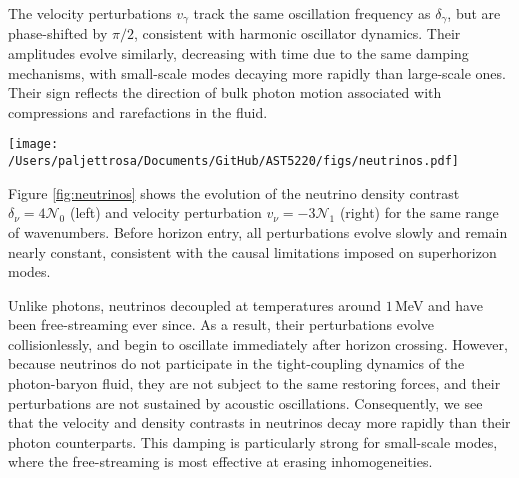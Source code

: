 \documentclass{aa}
\numberwithin{equation}{section}
\numberwithin{table}{section}
\numberwithin{figure}{section}
\begin{document}
The velocity perturbations $v_\gamma$ track the same oscillation frequency as $\delta_\gamma$, but are phase-shifted by $\pi/2$, consistent with harmonic oscillator dynamics. Their amplitudes evolve similarly, decreasing with time due to the same damping mechanisms, with small-scale modes decaying more rapidly than large-scale ones. Their sign reflects the direction of bulk photon motion associated with compressions and rarefactions in the fluid.


\begin{figure*}
  \centering
  \texttt{[image: /Users/paljettrosa/Documents/GitHub/AST5220/figs/neutrinos.pdf]}
  \caption{Evolution of neutrino density $\delta_\nu=4\mathcal{N}_0$ (left) and velocity $v_\nu=-3\mathcal{N}_1$ (right) perturbations. 
  Neutrino perturbations behave similarly to photons at early times but evolve differently due to free-streaming, with scale-dependent residuals emerging after horizon entry.}\label{fig:neutrinos}
\end{figure*}

Figure \ref{fig:neutrinos} shows the evolution of the neutrino density contrast $\delta_\nu = 4\mathcal{N}_0$ (left) and velocity perturbation $v_\nu = -3\mathcal{N}_1$ (right) for the same range of wavenumbers. Before horizon entry, all perturbations evolve slowly and remain nearly constant, consistent with the causal limitations imposed on superhorizon modes.

Unlike photons, neutrinos decoupled at temperatures around $1\,$MeV and have been free-streaming ever since. As a result, their perturbations evolve collisionlessly, and begin to oscillate immediately after horizon crossing. However, because neutrinos do not participate in the tight-coupling dynamics of the photon-baryon fluid, they are not subject to the same restoring forces, and their perturbations are not sustained by acoustic oscillations. Consequently, we see that the velocity and density contrasts in neutrinos decay more rapidly than their photon counterparts. This damping is particularly strong for small-scale modes, where the free-streaming is most effective at erasing inhomogeneities.
\end{document}
